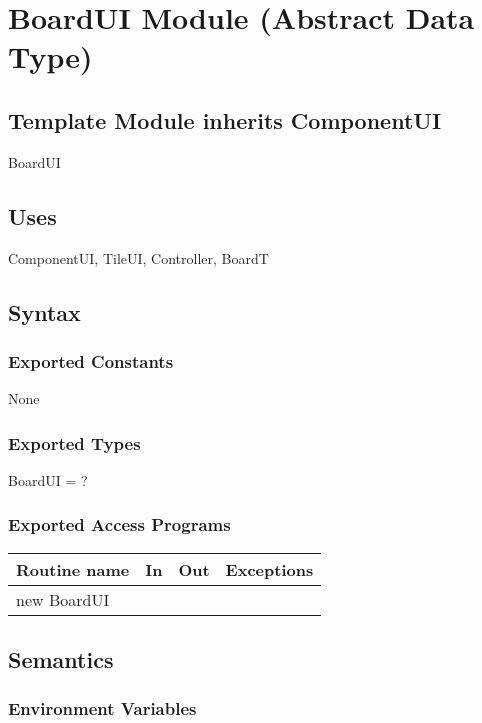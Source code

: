 \documentclass[12pt]{article}
\begin{document}
\newpage

\section* {BoardUI Module (Abstract Data Type)}

\subsection*{Template Module inherits ComponentUI}

BoardUI

\subsection* {Uses}

ComponentUI, TileUI, Controller, BoardT

\subsection* {Syntax}

\subsubsection* {Exported Constants}

None

\subsubsection* {Exported Types}

BoardUI = ?

\subsubsection* {Exported Access Programs}

\begin{tabular}{| l | l | l | p{6cm} |}
\hline
\textbf{Routine name} & \textbf{In} & \textbf{Out} & \textbf{Exceptions}\\
\hline
new BoardUI & & &  \\
\hline
\end{tabular}

\subsection* {Semantics}

\subsubsection* {Environment Variables}
\end{document}
